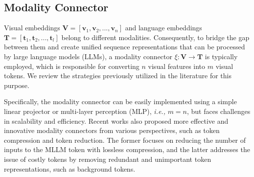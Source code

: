\begin{comment}

2) \textbf{Hybrid of OCR-Free and OCR-Based Encoders}. This strategy combines an OCR-free encoder (e.g., CLIP) with an OCR-based encoder to simultaneously process visual and textual information. OCR-free encoders focus on extracting high-level visual features, such as objects and scenes, while OCR-based encoders specialize in capturing textual content and layout information from images. This hybrid approach is particularly effective for tasks involving text-rich images or documents.
\end{comment}

\subsection{Modality Connector}
\label{section_connector}

Visual embeddings $\mathbf{V} = [\mathbf{v}_{1}, \mathbf{v}_{2},..., \mathbf{v}_{n}]$ and language embeddings $\mathbf{T} = [\mathbf{t}_{1}, \mathbf{t}_{2},..., \mathbf{t}_{l}]$ belong to different modalities. Consequently, to bridge the gap between them and create unified sequence representations that can be processed by large language models (LLMs), a modality connector $\xi: \mathbf{V} \xrightarrow{} \mathbf{T}$ is typically employed, which is responsible for converting $n$ visual features into $m$ visual tokens.
We review the strategies previously utilized in the literature for this purpose. 

Specifically, the modality connector can be easily implemented using a simple linear projector or multi-layer perception (MLP), \emph{i.e.,} $m=n$, but faces challenges in scalability and efficiency. Recent works also proposed more effective and innovative modality connectors from various perspectives, such as token compression and token reduction. The former focuses on reducing the number of inputs to the MLLM token with lossless compression, and the latter addresses the issue of costly tokens by removing redundant and unimportant token representations, such as background tokens.

